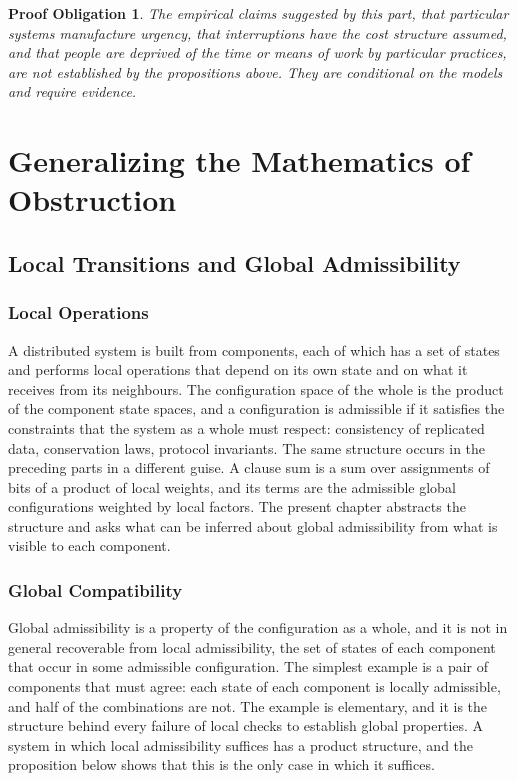 \documentclass[11pt,letterpaper]{report}
\theoremstyle{plain}
\newtheorem{obligation}[theorem]{Proof Obligation}
\theoremstyle{definition}
\theoremstyle{remark}
\begin{document}
\begin{obligation}\label{ob:attention}
The empirical claims suggested by this part, that particular systems manufacture urgency, that interruptions have the cost structure assumed, and that people are deprived of the time or means of work by particular practices, are not established by the propositions above. They are conditional on the models and require evidence.
\end{obligation}

\part{Generalizing the Mathematics of Obstruction}

\chapter{Local Transitions and Global Admissibility}

\section{Local Operations}

A distributed system is built from components, each of which has a set of states and performs local operations that depend on its own state and on what it receives from its neighbours. The configuration space of the whole is the product of the component state spaces, and a configuration is admissible if it satisfies the constraints that the system as a whole must respect: consistency of replicated data, conservation laws, protocol invariants. The same structure occurs in the preceding parts in a different guise. A clause sum is a sum over assignments of bits of a product of local weights, and its terms are the admissible global configurations weighted by local factors. The present chapter abstracts the structure and asks what can be inferred about global admissibility from what is visible to each component.

\section{Global Compatibility}

Global admissibility is a property of the configuration as a whole, and it is not in general recoverable from local admissibility, the set of states of each component that occur in some admissible configuration. The simplest example is a pair of components that must agree: each state of each component is locally admissible, and half of the combinations are not. The example is elementary, and it is the structure behind every failure of local checks to establish global properties. A system in which local admissibility suffices has a product structure, and the proposition below shows that this is the only case in which it suffices.
\end{document}
